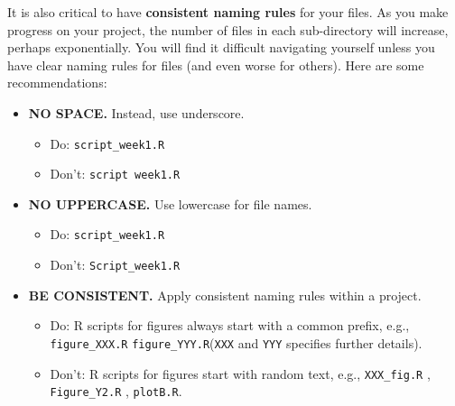 \documentclass[
]{book}
\providecommand{\tightlist}{%
  \setlength{\itemsep}{0pt}\setlength{\parskip}{0pt}}
\begin{document}
It is also critical to have \textbf{consistent naming rules} for your files. As you make progress on your project, the number of files in each sub-directory will increase, perhaps exponentially. You will find it difficult navigating yourself unless you have clear naming rules for files (and even worse for others). Here are some recommendations:

\begin{itemize}
\tightlist
\item
  \textbf{NO SPACE.} Instead, use underscore.

  \begin{itemize}
  \tightlist
  \item
    Do: \texttt{script\_week1.R}
  \item
    Don't: \texttt{script\ week1.R}
  \end{itemize}
\item
  \textbf{NO UPPERCASE.} Use lowercase for file names.

  \begin{itemize}
  \tightlist
  \item
    Do: \texttt{script\_week1.R}
  \item
    Don't: \texttt{Script\_week1.R}
  \end{itemize}
\item
  \textbf{BE CONSISTENT.} Apply consistent naming rules within a project.

  \begin{itemize}
  \tightlist
  \item
    Do: R scripts for figures always start with a common prefix, e.g., \texttt{figure\_XXX.R} \texttt{figure\_YYY.R}(\texttt{XXX} and \texttt{YYY} specifies further details).
  \item
    Don't: R scripts for figures start with random text, e.g., \texttt{XXX\_fig.R} , \texttt{Figure\_Y2.R} , \texttt{plotB.R}.
  \end{itemize}
\end{itemize}

  
\end{document}

